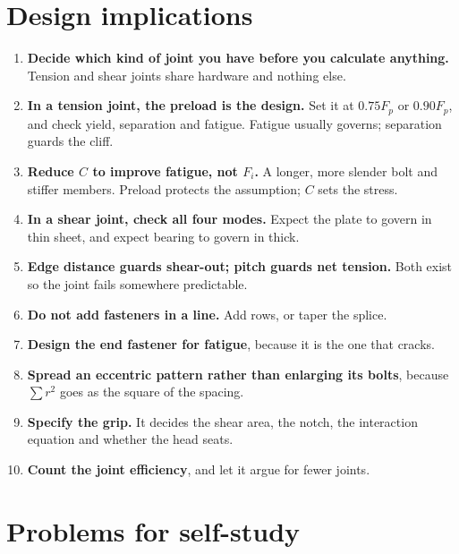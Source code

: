 \documentclass[11pt,a4paper]{article}
\begin{document}
\section{Design implications}

\begin{enumerate}[leftmargin=*,itemsep=3pt]
\item \textbf{Decide which kind of joint you have before you calculate anything.} Tension and shear
  joints share hardware and nothing else.
\item \textbf{In a tension joint, the preload is the design.} Set it at $0.75F_p$ or $0.90F_p$, and
  check yield, separation and fatigue. Fatigue usually governs; separation guards the cliff.
\item \textbf{Reduce $C$ to improve fatigue, not $F_i$.} A longer, more slender bolt and stiffer
  members. Preload protects the assumption; $C$ sets the stress.
\item \textbf{In a shear joint, check all four modes.} Expect the plate to govern in thin sheet,
  and expect bearing to govern in thick.
\item \textbf{Edge distance guards shear-out; pitch guards net tension.} Both exist so the joint
  fails somewhere predictable.
\item \textbf{Do not add fasteners in a line.} Add rows, or taper the splice.
\item \textbf{Design the end fastener for fatigue}, because it is the one that cracks.
\item \textbf{Spread an eccentric pattern rather than enlarging its bolts}, because $\sum r^2$ goes
  as the square of the spacing.
\item \textbf{Specify the grip.} It decides the shear area, the notch, the interaction equation and
  whether the head seats.
\item \textbf{Count the joint efficiency}, and let it argue for fewer joints.
\end{enumerate}

\section{Problems for self-study}
\end{document}
